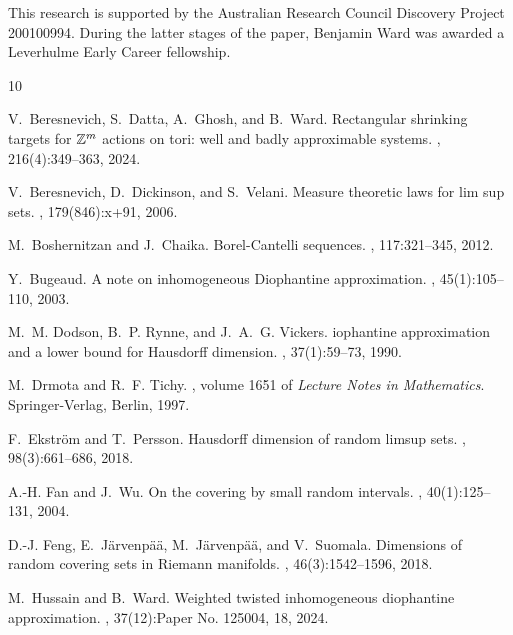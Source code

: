 \documentclass{amsart}
\theoremstyle{definition}
\newcommand{\0}{\mbf 0}%
\begin{document}
\medskip

 This research is supported by the Australian Research Council Discovery Project 200100994. During the latter stages of the paper, Benjamin Ward was awarded a Leverhulme Early Career fellowship.


\begin{thebibliography}{10}

V.~Beresnevich, S.~Datta, A.~Ghosh, and B.~Ward.
\newblock Rectangular shrinking targets for {$\Bbb Z^m$} actions on tori: well
  and badly approximable systems.
, 216(4):349--363, 2024.

V.~Beresnevich, D.~Dickinson, and S.~Velani.
\newblock Measure theoretic laws for lim sup sets.
, 179(846):x+91, 2006.

M.~Boshernitzan and J.~Chaika.
\newblock Borel-{C}antelli sequences.
, 117:321--345, 2012.

Y.~Bugeaud.
\newblock A note on inhomogeneous {D}iophantine approximation.
, 45(1):105--110, 2003.

M.~M. Dodson, B.~P. Rynne, and J.~A.~G. Vickers.
iophantine approximation and a lower bound for {H}ausdorff
  dimension.
, 37(1):59--73, 1990.

M.~Drmota and R.~F. Tichy.
, volume 1651 of {\em
  Lecture Notes in Mathematics}.
\newblock Springer-Verlag, Berlin, 1997.

F.~Ekstr\"{o}m and T.~Persson.
\newblock Hausdorff dimension of random limsup sets.
, 98(3):661--686, 2018.

A.-H. Fan and J.~Wu.
\newblock On the covering by small random intervals.
, 40(1):125--131,
  2004.

D.-J. Feng, E.~J\"{a}rvenp\"{a}\"{a}, M.~J\"{a}rvenp\"{a}\"{a}, and V.~Suomala.
\newblock Dimensions of random covering sets in {R}iemann manifolds.
, 46(3):1542--1596, 2018.

M.~Hussain and B.~Ward.
\newblock Weighted twisted inhomogeneous diophantine approximation.
, 37(12):Paper No. 125004, 18, 2024.


\end{thebibliography}
\end{document}
